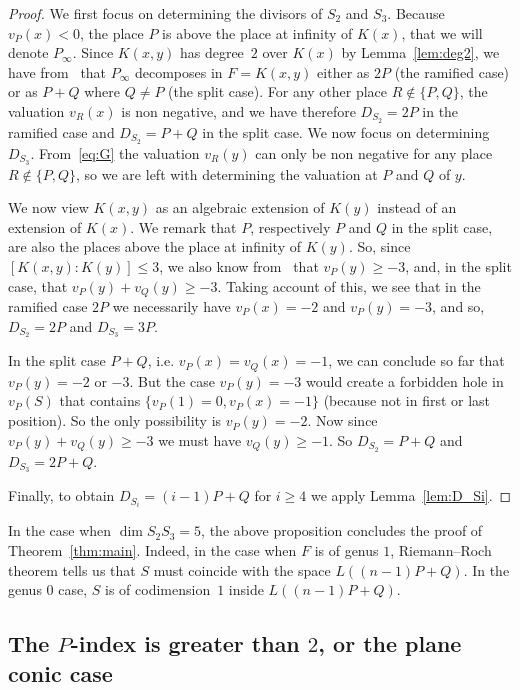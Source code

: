 \documentclass[10pt]{amsart}
\theoremstyle{definition}
\theoremstyle{remark}
\renewcommand{\geq}{\geqslant}
\renewcommand{\leq}{\leqslant}
\begin{document}
\begin{proof}
We first focus on determining the divisors of $S_2$ and $S_3$. Because $v_P(x)<0$, the place $P$ is above the place at infinity of $K(x)$, that we will denote $P_\infty$. Since $K(x,y)$ has degree~$2$ over $K(x)$ by Lemma~\ref{lem:deg2}, we have from~\cite[Chapter~3]{Stichtenoth} that $P_{\infty}$ decomposes in $F=K(x,y)$ either as $2P$ (the ramified case) or as $P+Q$ where $Q\neq P$ (the split case). For any other place $R\notin\{P, Q\}$, the valuation $v_R(x)$ is non negative, and we have therefore $D_{S_2}=2P$ in the ramified case and $D_{S_2}=P+Q$ in the split case. We now focus on determining $D_{S_3}$. From~\eqref{eq:G} the valuation $v_R(y)$ can only be non negative for any place $R \notin\{P, Q\}$, so we are left with determining the valuation at $P$ and $Q$ of $y$.

We now view $K(x,y)$ as an algebraic extension of $K(y)$ instead of an extension of $K(x)$. We remark that $P$, respectively $P$ and $Q$ in the split case, are also the places above the place at infinity of $K(y)$. So, since $[K(x,y):K(y)]\leq3$, we also know from~\cite[Chapter~3]{Stichtenoth} that $v_P(y)\geq-3$, and, in the split case, that $v_P(y)+v_Q(y)\geq-3$. Taking account of this, we see that in the ramified case $2P$ we necessarily have $v_P(x)=-2$ and $v_P(y)=-3$, and so, $D_{S_2}=2P$ and $D_{S_3}=3P$.

In the split case $P+Q$, i.e. $v_P(x)=v_Q(x)=-1$, we can conclude so far that $v_P(y)=-2$ or $-3$. But the case $v_P(y)=-3$ would create a forbidden hole in $v_P(S)$ that contains $\{v_P(1)=0,v_P(x)=-1\}$ (because not in first or last position). So the only possibility is $v_P(y)=-2$. Now since $v_P(y)+v_Q(y)\geq-3$ we must have $v_Q(y)\geq-1$. So $D_{S_2}=P+Q$ and $D_{S_3}=2P+Q$.

Finally, to obtain $D_{S_i}=(i-1)P+Q$ for $i\geq4$ we apply Lemma~\ref{lem:D_Si}.
\end{proof}

In the case when $\dim S_2S_3=5$, the above proposition concludes the proof of Theorem~\ref{thm:main}. Indeed, in the case when $F$ is of genus $1$, Riemann--Roch theorem tells us that $S$ must coincide with the space $L((n-1)P+Q)$. In the genus $0$ case, $S$ is of codimension~$1$ inside $L((n-1)P+Q)$.

\subsection{The \texorpdfstring{$P$}{P}-index is greater than \texorpdfstring{$2$}{2}, or the plane conic case}\label{sec:Pindex>2}
\end{document}
